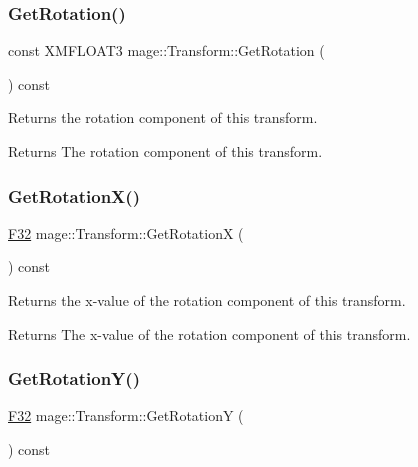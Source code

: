 \subsubsection{\texorpdfstring{Get\+Rotation()}{GetRotation()}}
{\footnotesize\ttfamily const X\+M\+F\+L\+O\+A\+T3 mage\+::\+Transform\+::\+Get\+Rotation (\begin{DoxyParamCaption}{ }\end{DoxyParamCaption}) const\hspace{0.3cm}{\ttfamily [noexcept]}}

Returns the rotation component of this transform.

\begin{DoxyReturn}{Returns}
The rotation component of this transform. 
\end{DoxyReturn}
\hypertarget{structmage_1_1_transform_ad3e1b49ccac234303ff28c8aea6f8e4a}{}\label{structmage_1_1_transform_ad3e1b49ccac234303ff28c8aea6f8e4a} 
\subsubsection{\texorpdfstring{Get\+Rotation\+X()}{GetRotationX()}}
{\footnotesize\ttfamily \hyperlink{namespacemage_aa97e833b45f06d60a0a9c4fc22ae02c0}{F32} mage\+::\+Transform\+::\+Get\+RotationX (\begin{DoxyParamCaption}{ }\end{DoxyParamCaption}) const\hspace{0.3cm}{\ttfamily [noexcept]}}

Returns the x-\/value of the rotation component of this transform.

\begin{DoxyReturn}{Returns}
The x-\/value of the rotation component of this transform. 
\end{DoxyReturn}
\hypertarget{structmage_1_1_transform_ac1962d03093b3671fcfb6a9b4f410628}{}\label{structmage_1_1_transform_ac1962d03093b3671fcfb6a9b4f410628} 
\subsubsection{\texorpdfstring{Get\+Rotation\+Y()}{GetRotationY()}}
{\footnotesize\ttfamily \hyperlink{namespacemage_aa97e833b45f06d60a0a9c4fc22ae02c0}{F32} mage\+::\+Transform\+::\+Get\+RotationY (\begin{DoxyParamCaption}{ }\end{DoxyParamCaption}) const\hspace{0.3cm}{\ttfamily [noexcept]}}

